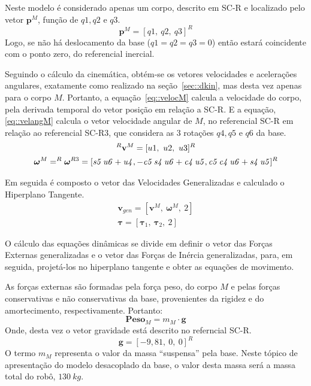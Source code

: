 Neste modelo é considerado apenas um corpo, descrito em SC-R e localizado pelo
vetor $\mathbf{p}^M$, função de $q1,q2$ e $q3$.
%
\begin{equation}
	\mathbf{p}^M = [q1,~q2,~q3]^R
\end{equation}
%
Logo, se não há deslocamento da base ($q1=q2=q3=0$) então estará coincidente com
o ponto zero, do referencial inercial.

Seguindo o cálculo da cinemática, obtém-se os vetores velocidades e acelerações
angulares, exatamente como realizado na seção~\ref{sec::dkin}, mas desta vez
apenas para o corpo $M$.
Portanto, a equação~\ref{eq::velocM} calcula a velocidade do corpo, pela
derivada temporal do vetor posição em relação a SC-R. E a equação,
\ref{eq::velangM} calcula o vetor velocidade angular de $M$, no referencial SC-R
em relação ao referencial SC-R3, que considera as 3 rotações $q4, q5$ e $q6$ da
base.
%
\begin{gather} 
	^{R}\mathbf{v}^{M} = [u1,~u2,~u3]^R \label{eq::velocM} \\
	\boldsymbol{\omega}^{M} = ^{R}\boldsymbol{\omega}^{R3} = [{\it s5}\,{\it
	u6}+{\it u4},-{\it c5}\,{\it s4}\,{\it u6}+{\it c4}\,{ \it u5},{\it c5}\,{\it c4}\,{\it u6}+{\it s4}\,{\it u5}]^{R}
\label{eq::velangM}
\end{gather}
%

Em seguida é composto o vetor das Velocidades Generalizadas e calculado o
Hiperplano Tangente.
%
\begin{gather}
	\mathbf{v}_{gen} = [ \mathbf{v}^{M},~ \boldsymbol{\omega}^{M},~ 2] \\
	\boldsymbol{\tau} = [\boldsymbol{\tau}_1,~ \boldsymbol{\tau}_2,~ 2]
\end{gather}
%

O cálculo das equações dinâmicas se divide em definir o vetor das Forças
Externas generalizadas e o vetor das Forças de Inércia generalizadas, para, em
seguida, projetá-los no hiperplano tangente e obter as equações de movimento.

As forças externas são formadas pela força peso, do corpo $M$ e
pelas forças conservativas e não conservativas da base, provenientes da rigidez
e do amortecimento, respectivamente. Portanto:
%
\begin{equation}
	\mathbf{Peso}_M = m_M \cdot \mathbf{g}
\end{equation}
%
Onde, desta vez o vetor gravidade está descrito no referncial SC-R. 
%
\begin{equation}
	\mathbf{g} = [-9,81,~0,~0]^{R}
\end{equation}
%
O termo $m_M$ representa o valor da massa ``suspensa'' pela base. Neste tópico
de apresentação do modelo desacoplado da base, o valor desta massa será a massa
total do robô, $130~kg$.

